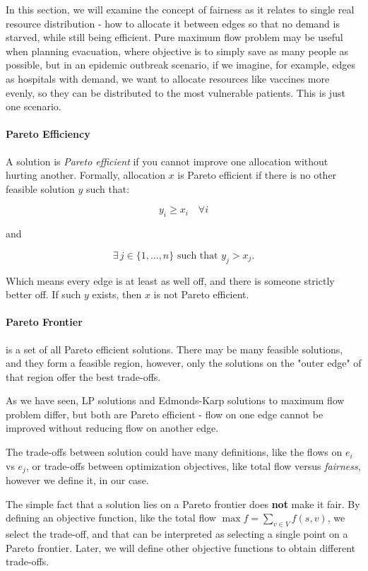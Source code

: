 \documentclass[12pt, openany]{article}
\begin{document}
In this section, we will examine the concept of fairness as it relates to single real resource distribution - how to allocate it between edges so that no demand is starved, while still being efficient. Pure maximum flow problem may be useful when planning evacuation, where objective is to simply save as many people as possible, but in an epidemic outbreak scenario, if we imagine, for example, edges as hospitals with demand, we want to allocate resources like vaccines more evenly, so they can be distributed to the most vulnerable patients. This is just one scenario.


\paragraph{\textbf{Pareto Efficiency}} A solution is \textit{Pareto efficient} if you cannot improve one allocation without hurting another. Formally, allocation $x$ is Pareto efficient if there is no other feasible solution $y$ such that:

\[
y_i \ge x_i \quad \forall i
\]

and

\[
\exists\, j \in \{1,\dots,n\} \text{ such that } y_j > x_j.
\]

Which means every edge is at least as well off, and there is someone strictly better off. If such $y$ exists, then $x$ is not Pareto efficient.

\paragraph{\textbf{Pareto Frontier}} is a set of all Pareto efficient solutions. There may be many feasible solutions, and they form a feasible region, however, only the solutions on the "outer edge" of that region offer the best trade-offs.

As we have seen, LP solutions and Edmonds-Karp solutions to maximum flow problem differ, but both are Pareto efficient - flow on one edge cannot be improved without reducing flow on another edge.

The trade-offs between solution could have many definitions, like the flows on $e_i$ vs $e_j$, or trade-offs between optimization objectives, like total flow versus \textit{fairness}, however we define it, in our case.

The simple fact that a solution lies on a Pareto frontier does \textbf{not} make it fair. By defining an objective function, like the total flow \( \max f = \sum_{v \in V} f(s,v) \), we select the trade-off, and that can be interpreted as selecting a single point on a Pareto frontier. Later, we will define other objective functions to obtain different trade-offs.
\end{document}
